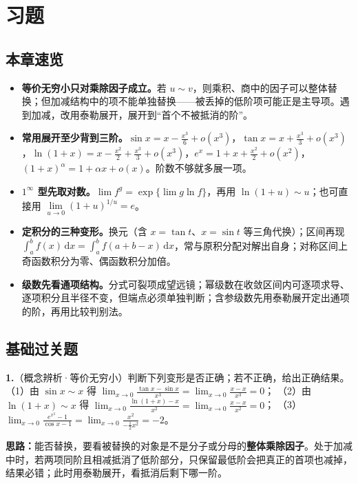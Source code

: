 \section{习题}

\subsection{本章速览}

\begin{itemize}
\item \textbf{等价无穷小只对乘除因子成立。}若 $u\sim v$，则乘积、商中的因子可以整体替换；但加减结构中的项不能单独替换——被丢掉的低阶项可能正是主导项。遇到加减，改用泰勒展开，展开到“首个不被抵消的阶”。
\item \textbf{常用展开至少背到三阶。}$\sin x=x-\frac{x^{3}}{6}+o(x^{3})$，$\tan x=x+\frac{x^{3}}{3}+o(x^{3})$，$\ln(1+x)=x-\frac{x^{2}}{2}+\frac{x^{3}}{3}+o(x^{3})$，$e^{x}=1+x+\frac{x^{2}}{2}+o(x^{2})$，$(1+x)^{\alpha}=1+\alpha x+o(x)$。阶数不够就多展一项。
\item \textbf{$1^{\infty}$ 型先取对数。}$\lim f^{g}=\exp\bigl\{\lim g\ln f\bigr\}$，再用 $\ln(1+u)\sim u$；也可直接用 $\lim\limits_{u\to0}(1+u)^{1/u}=e$。
\item \textbf{定积分的三种变形。}换元（含 $x=\tan t$、$x=\sin t$ 等三角代换）；区间再现 $\int_{a}^{b}f(x)\,\mathrm{d}x=\int_{a}^{b}f(a+b-x)\,\mathrm{d}x$，常与原积分配对解出自身；对称区间上奇函数积分为零、偶函数积分加倍。
\item \textbf{级数先看通项结构。}分式可裂项成望远镜；幂级数在收敛区间内可逐项求导、逐项积分且半径不变，但端点必须单独判断；含参级数先用泰勒展开定出通项的阶，再用比较判别法。
\end{itemize}

\subsection{基础过关题}

\textbf{1.}（概念辨析·等价无穷小）判断下列变形是否正确；若不正确，给出正确结果。
（1）由 $\sin x\sim x$ 得 $\displaystyle\lim_{x\to0}\frac{\tan x-\sin x}{x^{3}}=\lim_{x\to0}\frac{x-x}{x^{3}}=0$；
（2）由 $\ln(1+x)\sim x$ 得 $\displaystyle\lim_{x\to0}\frac{\ln(1+x)-x}{x^{2}}=\lim_{x\to0}\frac{x-x}{x^{2}}=0$；
（3）$\displaystyle\lim_{x\to0}\frac{e^{x^{2}}-1}{\cos x-1}=\lim_{x\to0}\frac{x^{2}}{-\frac{1}{2}x^{2}}=-2$。

\ifshowsolutions%
\textbf{思路：}能否替换，要看被替换的对象是不是分子或分母的\textbf{整体乘除因子}。处于加减中时，若两项同阶且相减抵消了低阶部分，只保留最低阶会把真正的首项也减掉，结果必错；此时用泰勒展开，看抵消后剩下哪一阶。

